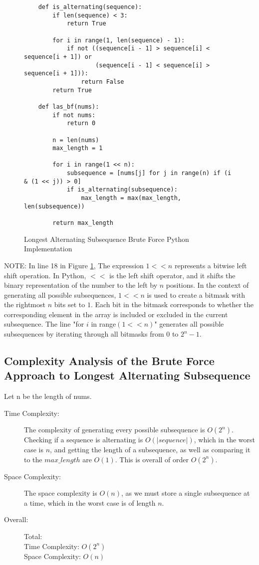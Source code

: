 \begin{figure}[H]
    \centering
    \begin{lstlisting}
    def is_alternating(sequence):
        if len(sequence) < 3:
            return True
    
        for i in range(1, len(sequence) - 1):
            if not ((sequence[i - 1] > sequence[i] < sequence[i + 1]) or
                    (sequence[i - 1] < sequence[i] > sequence[i + 1])):
                return False
        return True
    
    def las_bf(nums):
        if not nums:
            return 0
    
        n = len(nums)
        max_length = 1
    
        for i in range(1 << n):
            subsequence = [nums[j] for j in range(n) if (i & (1 << j)) > 0]
            if is_alternating(subsequence):
                max_length = max(max_length, len(subsequence))
    
        return max_length
    \end{lstlisting}
    \caption{Longest Alternating Subsequence Brute Force Python Implementation}
    \label{fig:las-bf}
\end{figure}


NOTE: In line 18 in Figure \ref{fig:las-bf}, The expression $1 << n$ represents a bitwise left shift operation.
In Python, $<<$ is the left shift operator, and it shifts the binary representation of the number to the left by $n$ positions.
In the context of generating all possible subsequences, $1 << n$ is used to create a bitmask with the rightmost $n$ bits set to $1$.
Each bit in the bitmask corresponds to whether the corresponding element in the array is included or excluded in the current subsequence.
The line "for $i$ in range$(1 << n)$" generates all possible subsequences by iterating through all bitmasks from 0 to $2^n-1$.

\subsection{Complexity Analysis of the Brute Force Approach to Longest Alternating Subsequence}
Let n be the length of nums.
\begin{description}
    \item[Time Complexity:]
        The complexity of generating every possible subsequence is $O(2^n)$.
        Checking if a sequence is alternating is $O(|sequence|)$, which in the worst case is $n$,
        and getting the length of a subsequence, as well as comparing it to the $max\_length$ are $O(1)$.
        This is overall of order $O(2^n)$.
        
    \item[Space Complexity:] 
        The space complexity is $O(n)$, as we must store a single subsequence at a time,
        which in the worst case is of length $n$.
        
    \item[Overall:] Total:\\
        Time Complexity: $O(2^n)$\\
        Space Complexity: $O(n)$
    
\end{description}


